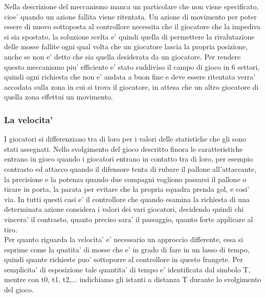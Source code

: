 Nella descrizione del meccanismo manca un particolare che non viene specificato, cioe’ quando un azione fallita viene ritentata. Un azione di movimento per poter essere di nuovo sottoposta al controllore necessita che il giocatore che la impediva si sia spostato, la soluzione scelta e’ quindi quella di permettere la rivalutazione delle mosse fallite ogni qual volta che un giocatore lascia la propria posizione, anche se non e’ detto che sia quella desiderata da un giocatore. Per rendere questo meccanismo piu’ efficiente e’ stato suddiviso il campo di gioco in 6 settori, quindi ogni richiesta che non e’ andata a buon fine e deve essere ritentata verra’ accodata sulla zona in cui si trova il giocatore, in attesa che un altro giocatore di quella zona effettui un movimento.

\subsubsection*{La velocita'}
%
\label{sec:analisi_concorrenza_velocita}

I giocatori si differenziano tra di loro per i valori delle statistiche che gli sono stati assegnati. Nello svolgimento del gioco descritto finora le caratteristiche entrano in gioco quando i giocatori entrano in contatto tra di loro, per esempio contrasto ed attacco quando il difensore tenta di rubare il pallone all’attaccante, la precisione e la potenza quando due compagni vogliono passarsi il pallone o tirare in porta, la parata per evitare che la propria squadra prenda gol, e cosi’ via. In tutti questi casi e’ il controllore che quando esamina la richiesta di una determinata azione considera i valori dei vari giocatori, decidendo quindi chi vincera’ il contrasto, quanto preciso sara’ il passaggio, quanto forte applicare al tiro.\\

Per quanto riguarda la velocita’ e’ necessario un approccio differente, essa si esprime come la quatita’ di mosse che e’ in grado di fare in un lasso di tempo, quindi quante richieste puo’ sottoporre al controllore in questo frangete. Per semplicita’ di esposizione tale quantita’ di tempo e’ identificata dal simbolo T, mentre con t0, t1, t2,... indichiamo gli istanti a distanza T durante lo svolgimento del gioco.\\

